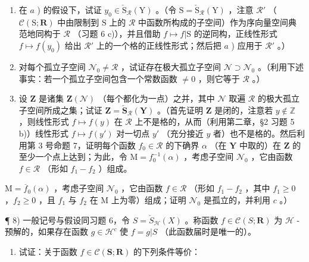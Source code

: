 \begin{enumerate}
\def\labelenumi{\alph{enumi})}
\setcounter{enumi}{1}
\item
  在 \(a\) ) 的假设下，试证 \(y_0 \in \check{\mathrm{S}}_{\mathcal{R}}(\mathrm{Y})\) 。（令 \(\mathrm{S} = \check{\mathrm{S}}_{\mathcal{R}}(\mathrm{Y})\) ，注意 \(\mathcal{R}'\) （\(\mathcal{C}(\mathrm{S}; \mathbf{R})\) 中由限制到 \(\mathrm{S}\) 上的 \(\mathcal{R}\) 中函数所构成的子空间）作为序向量空间典范地同构于 \(\mathcal{R}\) （习题 6 c)），并且借助 \(f \mapsto f|\mathrm{S}\) 的逆同构，正线性形式 \(f \mapsto f(y_0)\) 给出 \(\mathcal{R}'\) 上的一个格的正线性形式；然后把 \(a\) ) 应用于 \(\mathcal{R}'\) 。）
\item
  对每个孤立子空间 \(\mathcal{N}_0 \neq \mathcal{R}\) ，试证存在极大孤立子空间 \(\mathcal{N} \supset \mathcal{N}_0\) 。（利用下述事实：若一个孤立子空间包含一个常数函数 \(\neq 0\) ，则它等于 \(\mathcal{R}\) 。）
\item
  设 \(\mathbf{Z}\) 是诸集 \(\mathbf{Z}(\mathcal{N})\) （每个都化为一点）之并，其中 \(\mathcal{N}\) 取遍 \(\mathcal{R}\) 的极大孤立子空间所成之集；试证 \(\mathbf{Z} = \check{\mathbf{S}}_{\mathcal{R}}(\mathbf{Y})\) 。（首先证明 \(\mathbf{Z}\) 是闭的，注意若 \(y \notin \mathbb{Z}\) ，则线性形式 \(f \mapsto f(y)\) 在 \(\mathcal{R}\) 上不是格的，从而（利用第二章，§2 习题 5 b)）线性形式 \(f \mapsto f(y')\) 对一切点 \(y'\) （充分接近 \(y\) 者）也不是格的。然后利用第 3 号命题 7，证明每个函数 \(f_0 \in \mathcal{R}\) 的下确界 \(\alpha\) （在 \(\mathbf{Y}\) 中取的）在 \(\mathbf{Z}\) 的至少一个点上达到；为此，令 \(\mathrm{M} = f_0^{-1}(\alpha)\) ，考虑子空间 \(\mathcal{N}_0\) ，它由函数 \(f \in \mathcal{R}\) （形如 \(f_1 - f_2\) ）组成。
\end{enumerate}

\(\mathrm{M} = \overline{f}_0(\alpha)\) ，考虑子空间 \(\mathcal{N}_0\) ，它由函数 \(f \in \mathcal{R}\) （形如 \(f_1 - f_2\) ，其中 \(f_1 \geqslant 0\) ，\(f_2 \geqslant 0\) ，且 \(f_1\) 与 \(f_2\) 在 \(\mathrm{M}\) 上为零）组成；证明 \(\mathcal{N}_0\) 是孤立的，并利用 \(c\) 。）

¶ 8) 一般记号与假设同习题 6，令 \(S = \check{S}_{\mathcal{H}}(X)\) 。称函数 \(f \in \mathcal{C}(S; \mathbf{R})\) 为 \(\mathcal{H}\) -预解的，如果存在函数 \(g \in \mathcal{H}^c\) 使 \(f = g|S\) （此函数届时是唯一的）。

\begin{enumerate}
\def\labelenumi{\alph{enumi})}
\tightlist
\item
  试证：关于函数 \(f \in \mathcal{C}(\mathbf{S};\mathbf{R})\) 的下列条件等价：
\end{enumerate}


